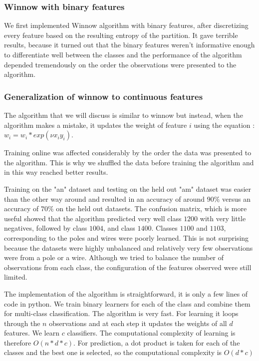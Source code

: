 \documentclass[10pt,a4paper]{article}
\begin{document}
\subsubsection{Winnow with binary features}
We first implemented Winnow algorithm with binary features, after discretizing every feature based on the resulting entropy of the partition. It gave terrible results, because it turned out that the binary features weren't informative enough to differentiate well between the classes and the performance of the algorithm depended tremendously on the order the observations were presented to the algorithm. 

\subsubsection{Generalization of winnow to continuous features}

The algorithm that we will discuss is similar to winnow but instead, when the algorithm makes a mistake, it updates the weight of feature $i$ using the equation : $w_i = w_i*exp(\nu x_i y_i)$. 

Training online was affected considerably by the order the data was presented to the algorithm. This is why we shuffled the data before training the algorithm and in this way reached better results.

Training on the "an" dataset and testing on the held out "am" dataset was easier than the other way around and resulted in an accuracy of around $90\%$ versus an accuracy of $70\%$ on the held out datasets. The confusion matrix, which is more useful showed that the algorithm predicted very well class $1200$ with very little negatives, followed by class $1004$, and class $1400$. Classes $1100$ and $1103$, corresponding to the poles and wires were poorly learned. This is not surprising because the datasets were highly unbalanced and relatively very few observations were from a pole or a wire. Although we tried to balance the number of observations from each class, the configuration of the features observed were still limited.

The implementation of the algorithm is straightforward, it is only a few lines of code in python. We train binary learners for each of the class and combine them for multi-class classification. The algorithm is very fast. For learning it loops through the $n$ observations and at each step it updates the weights of all $d$ features. We learn $c$ classifiers. The computational complexity of learning is therefore $O(n*d*c)$. For prediction, a dot product is taken for each of the classes and the best one is selected, so the computational complexity is $O(d*c)$
\end{document}
